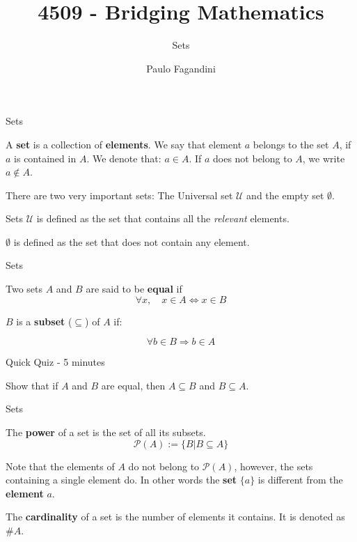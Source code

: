 \documentclass[aspectratio=169, handout]{beamer}
\title[]{4509 - Bridging Mathematics}
\subtitle{Sets}
\author[P. Fagandini]{Paulo Fagandini}
\institute{}
\date{}
\begin{document}
\begin{frame}{Sets}

A \textbf{set} is a collection of \textbf{elements}. We say that element $a$ belongs to the set $A$, if $a$ is contained in $A$. We denote that: $a\in A$. If $a$ does not belong to $A$, we write $a\notin A$.\pause

\vspace{0.5cm}
There are two very important sets: The Universal set $\mathcal{U}$ and the empty set $\emptyset$.
    
\end{frame}

\begin{frame}{Sets}
    $\mathcal{U}$ is defined as the set that contains all the \emph{relevant} elements.
    
    \vspace{1cm}
    
    $\emptyset$ is defined as the set that does not contain any element.

    
\end{frame}

\begin{frame}{Sets}

    \begin{definition}
    Two sets $A$ and $B$ are said to be \textbf{equal} if $$\forall x,\quad x\in A\Leftrightarrow x\in  B$$
    \end{definition}

    \vspace{1cm}
    
    \begin{definition}
    
    $B$ is a \textbf{subset} ($\subseteq$) of $A$ if:
    
    $$\forall b\in B\Rightarrow b\in A$$
    \end{definition}
    
\end{frame}

\begin{frame}{Quick Quiz - 5 minutes}
    
    Show that if $A$ and $B$ are equal, then $A\subseteq B$ and $B\subseteq A$.
    
\end{frame}

\begin{frame}{Sets}
    \begin{definition}
        The \textbf{power} of a set is the set of all its subsets.
        $$\mathcal{P}(A):=\{B|B\subseteq A\}$$
    \end{definition}
    
    Note that the elements of $A$ do not belong to $\mathcal{P}(A)$, however, the sets containing a single element do. In other words the \textbf{set} $\{a\}$ is different from the \textbf{element} $a$.

    \begin{definition}
        The \textbf{cardinality} of a set is the number of elements it contains. It is denoted as $\#A$.
    \end{definition}

\end{frame}
\end{document}

